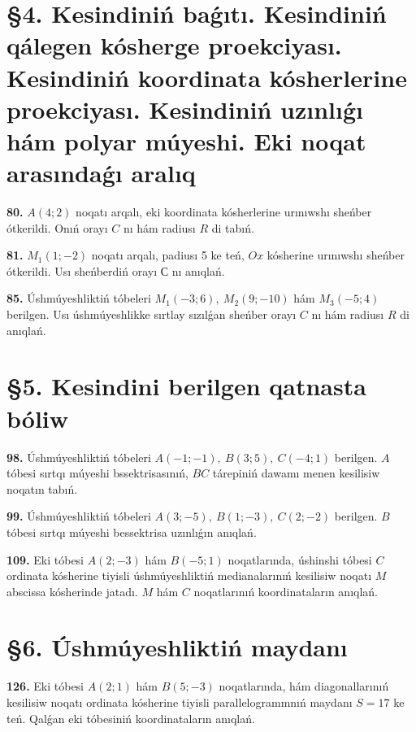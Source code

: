 \documentclass{article}
\begin{document}

\section*{\S 4. Kesindiniń baǵıtı. Kesindiniń qálegen kósherge proekciyası. 
Kesindiniń koordinata kósherlerine proekciyası. 
Kesindiniń uzınlıǵı hám polyar múyeshi. 
Eki noqat arasındaǵı aralıq}

\textbf{80.} \(A(4;2)\) noqatı arqalı, eki koordinata kósherlerine
urınıwshı sheńber ótkerildi. Onıń orayı $C$ nı hám radiusı
$R$ di tabıń.

\textbf{81.} \(M_{1}(1; - 2)\) noqatı arqalı, padiusı 5 ke teń,
$Ox$ kósherine urınıwshı sheńber ótkerildi. Usı sheńberdiń orayı
$С$ nı anıqlań.

\textbf{85.} Úshmúyeshliktiń tóbeleri \(M_{1}( - 3;6),\ M_{2}(9; - 10)\) 
hám \(M_{3}( - 5;4)\) berilgen. Usı úshmúyeshlikke sırtlay sızılǵan
sheńber orayı $C$ nı hám radiusı $R$ di anıqlań.

\section*{\S 5. Kesindini berilgen qatnasta bóliw}

\textbf{98.} Úshmúyeshliktiń tóbeleri
\(A( - 1; - 1),\ B(3;5),\ C( - 4;1)\) berilgen. $A$ tóbesi sırtqı
múyeshi bssektrisasınıń, $BC$ tárepiniń dawamı menen kesilisiw
noqatın tabıń.

\textbf{99.} Úshmúyeshliktiń tóbeleri
\(A(3; - 5),\ B(1; - 3),\ C(2; - 2)\) berilgen. $B$ tóbesi sırtqı
múyeshi bessektrisa uzınlıǵın anıqlań.

\textbf{109.} Eki tóbesi \(A(2; - 3)\) hám \(B( - 5;1)\) noqatlarında,
úshinshi tóbesi $C$ ordinata kósherine tiyisli úshmúyeshliktiń
medianalarınıń kesilisiw noqatı $M$ abscissa kósherinde jatadı.
$M$ hám $C$ noqatlarınıń koordinataların anıqlań.

\section*{\S 6. Úshmúyeshliktiń maydanı}

\textbf{126.} Eki tóbesi \(A(2;1)\) hám \(B(5; - 3)\) noqatlarında, hám
diagonallarınıń kesilisiw noqatı ordinata kósherine tiyisli
parallelogrammnıń maydanı \(S = 17\) ke teń. Qalǵan eki tóbesiniń
koordinataların anıqlań.
\end{document}
